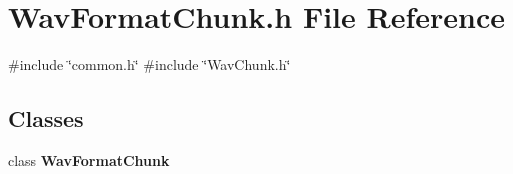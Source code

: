 \section{Wav\+Format\+Chunk.\+h File Reference}
\label{WavFormatChunk_8h}
{\ttfamily \#include \char`\"{}common.\+h\char`\"{}}\newline
{\ttfamily \#include \char`\"{}Wav\+Chunk.\+h\char`\"{}}\newline
\subsection*{Classes}
\begin{DoxyCompactItemize}
\item 
class \textbf{ Wav\+Format\+Chunk}
\end{DoxyCompactItemize}
